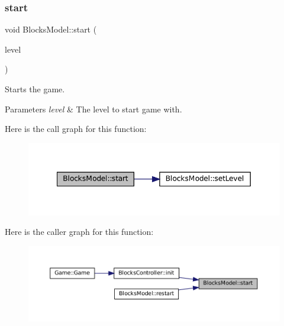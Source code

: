 \subsubsection{\texorpdfstring{start}{start}}
{\footnotesize\ttfamily void Blocks\+Model\+::start (\begin{DoxyParamCaption}\item[{const Game\+Level \&}]{level }\end{DoxyParamCaption})\hspace{0.3cm}{\ttfamily [slot]}}



Starts the game. 


\begin{DoxyParams}{Parameters}
{\em level} & The level to start game with. \\
\hline
\end{DoxyParams}
Here is the call graph for this function\+:
\nopagebreak
\begin{figure}[H]
\begin{center}
\leavevmode
\includegraphics[width=349pt]{class_blocks_model_a7e8f2f88ce1a2042772b50bf3d1321a2_cgraph}
\end{center}
\end{figure}
Here is the caller graph for this function\+:
\nopagebreak
\begin{figure}[H]
\begin{center}
\leavevmode
\includegraphics[width=350pt]{class_blocks_model_a7e8f2f88ce1a2042772b50bf3d1321a2_icgraph}
\end{center}
\end{figure}
\mbox{\label{class_blocks_model_a9fc884d31e972c84e2e3dcbce73b8377}} 

